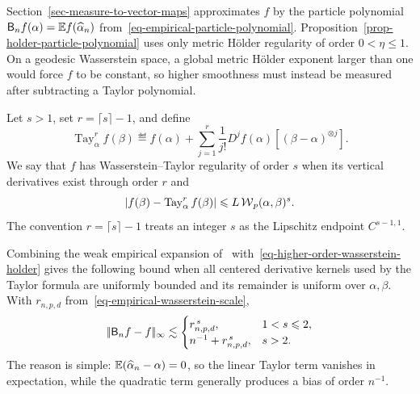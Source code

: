 \begin{rem}\label{rem-higher-order-particle-polynomial}
	Section~\ref{sec-measure-to-vector-maps} approximates \(f\) by the particle polynomial \(\mathsf B_n f(\alpha)=\mathbb{E} f(\widehat\alpha_n)\) from~\eqref{eq-empirical-particle-polynomial}. Proposition~\ref{prop-holder-particle-polynomial} uses only metric H\"older regularity of order \(0<\eta\leq1\). On a geodesic Wasserstein space, a global metric H\"older exponent larger than one would force \(f\) to be constant, so higher smoothness must instead be measured after subtracting a Taylor polynomial.

	Let \(s>1\), set \(r=\lceil s\rceil-1\), and define
	\[
		\operatorname{Tay}_\alpha^r f(\beta)
		\eqdef
		f(\alpha)
		+\sum_{j=1}^r\frac1{j!}
		D^j f(\alpha)[(\beta-\alpha)^{\otimes j}].
	\]
	We say that \(f\) has Wasserstein--Taylor regularity of order \(s\) when its vertical derivatives exist through order \(r\) and
	\begin{equation}\label{eq-higher-order-wasserstein-holder}
		\left|f(\beta)-\operatorname{Tay}_\alpha^r f(\beta)\right|
		\leqslant
		L\operatorname{\mathcal{W}}_p(\alpha,\beta)^s.
	\end{equation}
	The convention \(r=\lceil s\rceil-1\) treats an integer \(s\) as the Lipschitz endpoint \(C^{s-1,1}\).

	Combining the weak empirical expansion of~\cite{ChassagneuxSzpruchTse2022} with~\eqref{eq-higher-order-wasserstein-holder} gives the following bound when all centered derivative kernels used by the Taylor formula are uniformly bounded and its remainder is uniform over \(\alpha,\beta\). With \(r_{n,p,d}\) from~\eqref{eq-empirical-wasserstein-scale},
	\[
		|\!| \mathsf B_n f-f |\!|_\infty
		\lesssim
		\begin{cases}
			r_{n,p,d}^{\,s}, & 1<s\leqslant2,\\
			n^{-1}+r_{n,p,d}^{\,s}, & s>2.
		\end{cases}
	\]
	The reason is simple: \(\mathbb{E}(\widehat\alpha_n-\alpha)=0\), so the linear Taylor term vanishes in expectation, while the quadratic term generally produces a bias of order \(n^{-1}\).


\end{rem}
